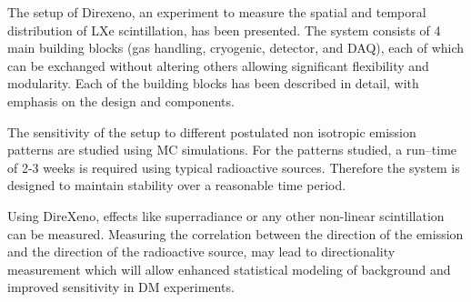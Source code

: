 The setup of Direxeno, an experiment to measure the spatial and temporal distribution of LXe scintillation, has 
been presented. The system consists of 4 main building blocks (gas handling, cryogenic, detector, 
and DAQ), each of which can be exchanged without altering others allowing significant flexibility 
and modularity. Each of the building blocks has been described in detail, with emphasis on the design 
and components.

The sensitivity of the setup to different postulated non isotropic emission patterns are studied using MC simulations. For the patterns studied, a run--time of 2-3 weeks is required using typical radioactive 
sources. Therefore the system is designed to maintain stability over a reasonable time period.

Using DireXeno, effects like superradiance or any other non-linear scintillation can be measured. 
Measuring the correlation between the direction of the emission and the direction of the radioactive 
source, may lead to directionality measurement which will allow enhanced statistical modeling of 
background and improved sensitivity in DM experiments.



